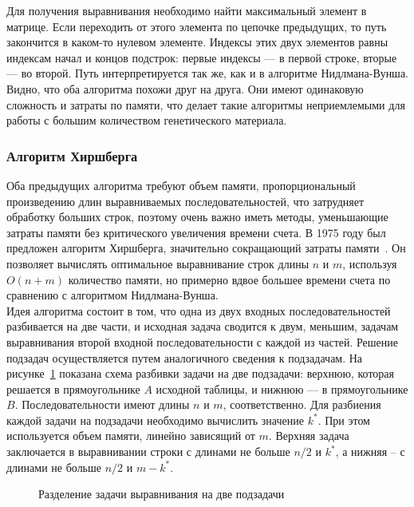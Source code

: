 \indent Для получения выравнивания необходимо найти максимальный элемент в матрице. Если переходить от этого элемента по цепочке предыдущих, то путь закончится в каком-то нулевом элементе. Индексы этих двух элементов равны индексам начал и концов подстрок: первые индексы --- в первой строке, вторые --- во второй. Путь интерпретируется так же, как и в алгоритме Нидлмана-Вунша.\\
\indent Видно, что оба алгоритма похожи друг на друга. Они имеют одинаковую сложность и затраты по памяти, что делает такие алгоритмы неприемлемыми для работы с большим количеством генетического материала.

\subsubsection[Алгоритм Хиршберга]{\large Алгоритм Хиршберга}
\hspace{\parindent} Оба предыдущих алгоритма требуют объем памяти, пропорциональный произведению длин выравниваемых последовательностей, что затрудняет обработку больших строк, поэтому очень важно иметь методы, уменьшающие затраты памяти без критического увеличения времени счета. В 1975 году был предложен алгоритм Хиршберга, значительно сокращающий затраты памяти~\cite{Hirshberg}. Он позволяет вычислять оптимальное выравнивание строк длины $n$ и $m$, используя $O(n+m)$ количество памяти, но примерно вдвое большее времени счета по сравнению с алгоритмом Нидлмана-Вунша.\\
\indent Идея алгоритма состоит в том, что одна из двух входных последовательностей разбивается на две части, и исходная задача сводится к двум, меньшим, задачам выравнивания второй входной последовательности с каждой из частей. Решение подзадач осуществляется путем аналогичного сведения к подзадачам. На рисунке~\ref{ris:Hirshberg} показана схема разбивки задачи на две подзадачи: верхнюю, которая решается в прямоугольнике $A$ исходной таблицы, и нижнюю --- в прямоугольнике $B$. Последовательности имеют длины $n$ и $m$, соответственно. Для разбиения каждой задачи на подзадачи необходимо вычислить значение $k^*$. При этом используется объем памяти, линейно зависящий от $m$. Верхняя задача заключается в выравнивании строки с длинами не больше $n/2$ и $k^*$, а нижняя – с длинами не больше $n/2$ и $m-k^*$. 

\begin{figure}[h]
	\caption{Разделение задачи выравнивания на две подзадачи}
	\label{ris:Hirshberg}
\end{figure}

